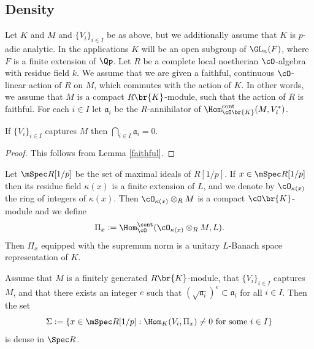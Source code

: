 \subsection{Density}

Let $K$ and $M$ and $\{V_i\}_{i\in I}$ be as above, but we additionally assume that $K$ is $p$-adic analytic. In the applications $K$ will be an open subgroup of $\GL_n(F)$, where $F$ is a finite extension of $\Qp$.
Let $R$ be a complete local noetherian $\cO$-algebra with residue field $k$. We assume that we are given a faithful, continuous
$\cO$-linear action of $R$ on $M$, which commutes with the action of $K$. In other words, we assume that $M$ is a compact $R\br {K}$-module, such that the action of $R$ is faithful.
For each $i\in I$ let $\mathfrak a_i$ be the $R$-annihilator of $\Hom_{\cO\br{K}}^{\rm cont}(M, V_i^*)$.

\begin{lem}\label{caught_it} If $\{V_i\}_{i\in I}$ captures $M$ then $\bigcap_{i\in I} \mathfrak a_i= 0$.
\end{lem}

\begin{proof} This follows from Lemma \ref{faithful}.
\end{proof}

Let $\mSpec R[1/p]$ be the set of maximal ideals of $R[1/p]$. If $x\in \mSpec R[1/p]$ then its residue field $\kappa(x)$ is a finite extension of $L$, and we denote by $\cO_{\kappa(x)}$
the ring of integers of $\kappa(x)$. Then $\cO_{\kappa(x)}\otimes_R M$ is a compact $\cO\br{K}$-module and
we define\vspace*{-3pt}
\[
\Pi_x:=\Hom^{\cont}_{\cO}(\cO_{\kappa(x)}\otimes_R M, L).
\]
Then $\Pi_x$ equipped with the supremum norm is a unitary $L$-Banach space representation of $K$.

\begin{prop}\label{dense_cap} Assume that $M$ is a finitely generated $R\br{K}$-module,
that $\{V_i\}_{i \in I}$ captures $M$,
and that there exists an integer $e$ such that $(\sqrt{\mathfrak a_i})^e \subset \mathfrak a_i$ for all $i\in I$. Then the set\vspace*{-3pt}
\[
\Sigma:=\{ x\in \mSpec R[1/p]: \Hom_K(V_i, \Pi_x)\neq 0 \text{ for some } i\in I\}
\]
is dense in $\Spec R$.
\end{prop}

